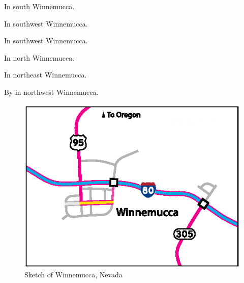 

\begin{LocationList}

In south Winnemucca.

In southwest Winnemucca.

\Location{\GasStation \Gas}
In southwest Winnemucca.

In north Winnemucca.

In northeast Winnemucca.

By  in northwest Winnemucca.

\end{LocationList}

\begin{figure}[h]
\includegraphics{cities/nevada/winnemucca}
\centering\caption{Sketch of Winnemucca, Nevada}
\end{figure}
